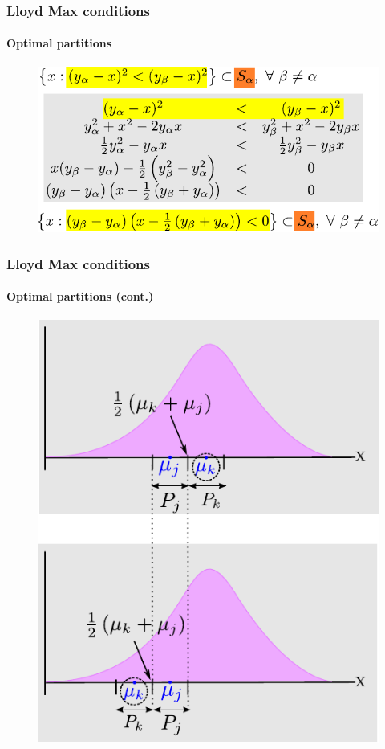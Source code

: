 \begin{frame}
\frametitle{Lloyd Max conditions}
\framesubtitle{Optimal partitions}
\logoCSIPCPL\mypagenum
	\begin{figure}				
		\includegraphics[width=1.0\textwidth]{figs/Quantization_optimalPartitions.pdf}
	\end{figure}
\end{frame}



\begin{frame}[plain]
\frametitle{Lloyd Max conditions}
\framesubtitle{Optimal partitions (cont.)}
\logoCSIPCPL\mypagenum
	\begin{changemargin}{-1.3in}{0in}
		\begin{figure}				
			\includegraphics[height=0.8\textheight]{figs/Quantization_optimalPartitions2.pdf}
		\end{figure}
	\end{changemargin}
\end{frame}


